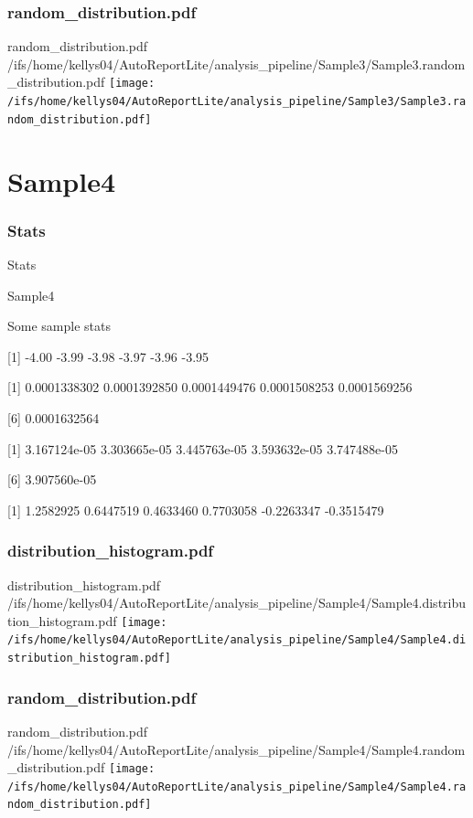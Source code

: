 \documentclass[8pt]{beamer}\usepackage[]{graphicx}\usepackage[]{color}
\begin{document}
\subsubsection{random\_distribution.pdf}
\begin{frame}{random\_distribution.pdf }
\scriptsize{/ifs/home/kellys04/AutoReportLite/analysis\_pipeline/Sample3/Sample3.random\_distribution.pdf}
\texttt{[image: /ifs/home/kellys04/AutoReportLite/analysis\_pipeline/Sample3/Sample3.random\_distribution.pdf]}
\end{frame}

\section{Sample4}
\subsubsection{Stats}
\begin{frame}{Stats }
\small{
Sample4 

Some sample stats

[1] -4.00 -3.99 -3.98 -3.97 -3.96 -3.95

[1] 0.0001338302 0.0001392850 0.0001449476 0.0001508253 0.0001569256

[6] 0.0001632564

[1] 3.167124e-05 3.303665e-05 3.445763e-05 3.593632e-05 3.747488e-05

[6] 3.907560e-05

[1]  1.2582925  0.6447519  0.4633460  0.7703058 -0.2263347 -0.3515479
}

\end{frame}

\subsubsection{distribution\_histogram.pdf}
\begin{frame}{distribution\_histogram.pdf }
\scriptsize{/ifs/home/kellys04/AutoReportLite/analysis\_pipeline/Sample4/Sample4.distribution\_histogram.pdf}
\texttt{[image: /ifs/home/kellys04/AutoReportLite/analysis\_pipeline/Sample4/Sample4.distribution\_histogram.pdf]}
\end{frame}

\subsubsection{random\_distribution.pdf}
\begin{frame}{random\_distribution.pdf }
\scriptsize{/ifs/home/kellys04/AutoReportLite/analysis\_pipeline/Sample4/Sample4.random\_distribution.pdf}
\texttt{[image: /ifs/home/kellys04/AutoReportLite/analysis\_pipeline/Sample4/Sample4.random\_distribution.pdf]}
\end{frame}
\end{document}
